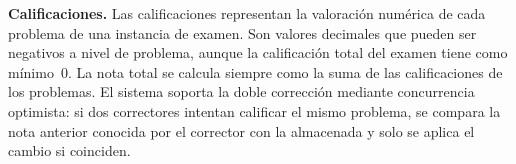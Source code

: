 
\item \textbf{Calificaciones.} \label{rf:grading}
Las calificaciones representan la valoración numérica de cada problema de una instancia de
examen. Son valores decimales que pueden ser negativos a nivel de problema, aunque la
calificación total del examen tiene como mínimo~0. La nota total se calcula siempre como la
suma de las calificaciones de los problemas. El sistema soporta la doble corrección
mediante concurrencia optimista: si dos correctores intentan calificar el mismo problema,
se compara la nota anterior conocida por el corrector con la almacenada y solo se aplica el
cambio si coinciden.

